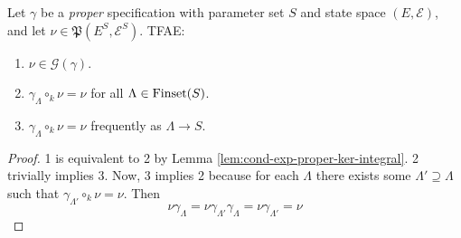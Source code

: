 \begin{lemma}
    \label{lem:gibbs-meas-tfae}
    \leanok

    Let $\gamma$ be a {\it proper} specification with parameter set $S$ and state space $(E, \mathcal{E})$, and let $\nu\in\mathfrak{P}(E^S, \mathcal{E}^S)$. TFAE:
    \begin{enumerate}
        \item $\nu\in\mathcal{G}(\gamma)$.
        \item $\gamma_\Lambda\circ_k\nu = \nu$ for all $\Lambda\in\operatorname{Finset}(S)$.
        \item $\gamma_\Lambda\circ_k\nu = \nu$ frequently as $\Lambda \to S$.
    \end{enumerate}
\end{lemma}
\begin{proof}
    \leanok

    1 is equivalent to 2 by Lemma \ref{lem:cond-exp-proper-ker-integral}. 2 trivially implies 3. Now, 3 implies 2 because for each $\Lambda$ there exists some $\Lambda' \supseteq \Lambda$ such that
    $\gamma_{\Lambda'}\circ_k\nu = \nu$. Then
    $$\nu\gamma_\Lambda = \nu\gamma_{\Lambda'}\gamma_\Lambda = \nu\gamma_{\Lambda'} = \nu$$
\end{proof}
